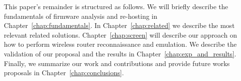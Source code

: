 This paper's remainder is structured as follows. We will briefly describe the fundamentals of firmware analysis and re-hosting in Chapter~\ref{chap:fundamentals}. In Chapter~\ref{chap:related} we describe the most relevant related solutions. Chapter~\ref{chap:screen} will describe our approach on how to perform wireless router reconnaissance and emulation. We describe the validation of our proposal and the results in Chapter~\ref{chap:exp_and_results}. Finally, we summarize our work and contributions and provide future works proposals in Chapter~\ref{chap:conclusions}.